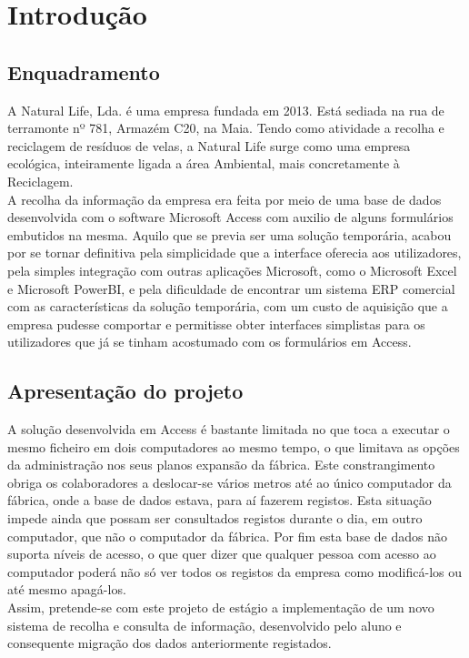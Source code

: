 \chapter{Introdução}
\label{cap:1}

\section{Enquadramento}
A Natural Life, Lda. é uma empresa fundada em 2013. Está sediada na rua de terramonte nº 781, Armazém C20, na Maia. Tendo como atividade a recolha e reciclagem de resíduos de velas, a Natural Life surge como uma empresa ecológica, inteiramente ligada a área Ambiental, mais concretamente à Reciclagem.\cite{NaturalLife}\\
A recolha da informação da empresa era feita por meio de uma base de dados desenvolvida com o software Microsoft Access\label{sym:MS_ACCESS} com auxilio de alguns formulários embutidos na mesma. Aquilo que se previa ser uma solução temporária, acabou por se tornar definitiva pela simplicidade que a interface oferecia aos utilizadores, pela simples integração com outras aplicações Microsoft, como o Microsoft Excel\label{sym:MS_EXCEL} e Microsoft PowerBI\label{sym:MS_POWERBI}, e pela dificuldade de encontrar um sistema ERP\label{sym:ERP} comercial com as características da solução temporária, com um custo de aquisição que a empresa pudesse comportar e permitisse obter interfaces simplistas para os utilizadores que já se tinham acostumado com os formulários em Access.

\section{Apresentação do projeto}
 A solução desenvolvida em Access é bastante limitada no que toca a executar o mesmo ficheiro em dois computadores ao mesmo tempo, o que limitava as opções da administração nos seus planos expansão da fábrica. Este constrangimento obriga os colaboradores a deslocar-se vários metros até ao único computador da fábrica, onde a base de dados estava, para aí fazerem registos. Esta situação impede ainda que possam ser consultados registos durante o dia, em outro computador, que não o computador da fábrica. Por fim esta base de dados não suporta níveis de acesso, o que quer dizer que qualquer pessoa com acesso ao computador poderá não só ver todos os registos da empresa como modificá-los ou até mesmo apagá-los.\\
Assim, pretende-se com este projeto de estágio a implementação de um novo sistema de recolha e consulta de informação, desenvolvido pelo aluno e consequente migração dos dados anteriormente registados.
\newpage




